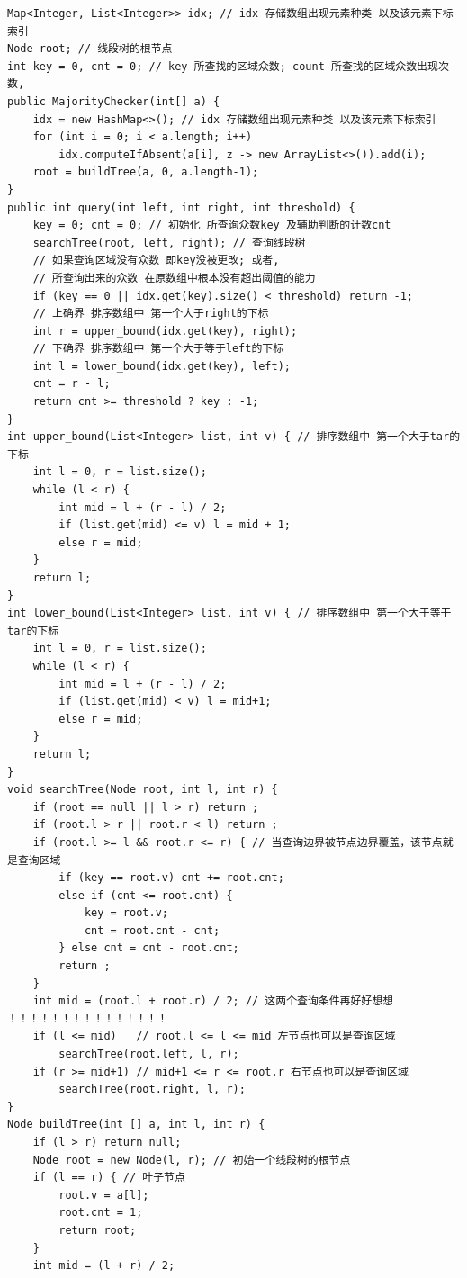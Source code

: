 \documentclass[9pt, b5paaper]{book}
\begin{document}
\begin{verbatim}
Map<Integer, List<Integer>> idx; // idx 存储数组出现元素种类 以及该元素下标索引
Node root; // 线段树的根节点
int key = 0, cnt = 0; // key 所查找的区域众数; count 所查找的区域众数出现次数, 
public MajorityChecker(int[] a) {
    idx = new HashMap<>(); // idx 存储数组出现元素种类 以及该元素下标索引
    for (int i = 0; i < a.length; i++)
        idx.computeIfAbsent(a[i], z -> new ArrayList<>()).add(i);
    root = buildTree(a, 0, a.length-1);
}
public int query(int left, int right, int threshold) {
    key = 0; cnt = 0; // 初始化 所查询众数key 及辅助判断的计数cnt
    searchTree(root, left, right); // 查询线段树
    // 如果查询区域没有众数 即key没被更改; 或者,
    // 所查询出来的众数 在原数组中根本没有超出阈值的能力
    if (key == 0 || idx.get(key).size() < threshold) return -1;
    // 上确界 排序数组中 第一个大于right的下标
    int r = upper_bound(idx.get(key), right);
    // 下确界 排序数组中 第一个大于等于left的下标
    int l = lower_bound(idx.get(key), left);
    cnt = r - l;
    return cnt >= threshold ? key : -1;
}
int upper_bound(List<Integer> list, int v) { // 排序数组中 第一个大于tar的下标
    int l = 0, r = list.size();
    while (l < r) {
        int mid = l + (r - l) / 2;
        if (list.get(mid) <= v) l = mid + 1;
        else r = mid;
    }
    return l;
}
int lower_bound(List<Integer> list, int v) { // 排序数组中 第一个大于等于tar的下标
    int l = 0, r = list.size();
    while (l < r) {
        int mid = l + (r - l) / 2;
        if (list.get(mid) < v) l = mid+1;
        else r = mid;
    }
    return l;
}
void searchTree(Node root, int l, int r) {
    if (root == null || l > r) return ;
    if (root.l > r || root.r < l) return ;
    if (root.l >= l && root.r <= r) { // 当查询边界被节点边界覆盖，该节点就是查询区域
        if (key == root.v) cnt += root.cnt;
        else if (cnt <= root.cnt) {
            key = root.v;
            cnt = root.cnt - cnt;
        } else cnt = cnt - root.cnt;
        return ;
    }
    int mid = (root.l + root.r) / 2; // 这两个查询条件再好好想想 ！！！！！！！！！！！！！！！
    if (l <= mid)   // root.l <= l <= mid 左节点也可以是查询区域
        searchTree(root.left, l, r);
    if (r >= mid+1) // mid+1 <= r <= root.r 右节点也可以是查询区域
        searchTree(root.right, l, r);
}
Node buildTree(int [] a, int l, int r) {
    if (l > r) return null;
    Node root = new Node(l, r); // 初始一个线段树的根节点
    if (l == r) { // 叶子节点  
        root.v = a[l];
        root.cnt = 1;
        return root;
    }
    int mid = (l + r) / 2;

\end{verbatim}
\end{document}
